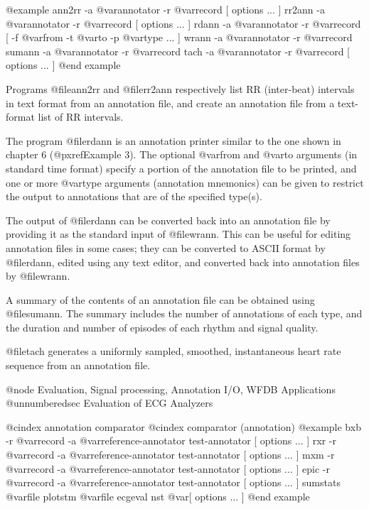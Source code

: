 {{{{{{{{@example
ann2rr -a @var{annotator} -r @var{record [ options ... ]}
rr2ann -a @var{annotator} -r @var{record [ options ... ]}
rdann -a @var{annotator} -r @var{record [} -f @var{from} -t @var{to} -p @var{type ... ]}
wrann -a @var{annotator} -r @var{record}
sumann -a @var{annotator} -r @var{record}
tach -a @var{annotator} -r @var{record [ options ... ]}
@end example

Programs @file{ann2rr} and @file{rr2ann} respectively list RR (inter-beat)
intervals in text format from an annotation file, and create an annotation
file from a text-format list of RR intervals.

The program @file{rdann} is an annotation printer similar to the one
shown in chapter 6 (@pxref{Example 3}).  The optional @var{from} and
@var{to} arguments (in standard time format) specify a portion of the
annotation file to be printed, and one or more @var{type} arguments
(annotation mnemonics) can be given to restrict the output to
annotations that are of the specified type(s).

The output of @file{rdann} can be converted back into an annotation file
by providing it as the standard input of @file{wrann}.  This can be
useful for editing annotation files in some cases;  they can be
converted to ASCII format by @file{rdann}, edited using any text editor,
and converted back into annotation files by @file{wrann}.

A summary of the contents of an annotation file can be obtained using
@file{sumann}.  The summary includes the number of annotations of each
type, and the duration and number of episodes of each rhythm and signal
quality.

@file{tach} generates a uniformly sampled, smoothed, instantaneous heart
rate sequence from an annotation file.

@node     Evaluation, Signal processing, Annotation I/O, WFDB Applications
@unnumberedsec Evaluation of ECG Analyzers

@cindex annotation comparator
@cindex comparator (annotation)
@example
bxb -r @var{record} -a @var{reference-annotator test-annotator [ options ... ]}
rxr -r @var{record} -a @var{reference-annotator test-annotator [ options ... ]}
mxm -r @var{record} -a @var{reference-annotator test-annotator [ options ... ]}
epic -r @var{record} -a @var{reference-annotator test-annotator [ options ... ]}
sumstats @var{file}
plotstm @var{file}
ecgeval
nst @var{[ options ... ]}
@end example

}}}}}}}}
